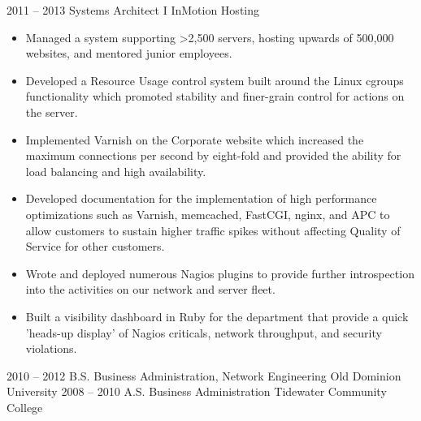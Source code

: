 \documentclass[9pt]{developercv}
\begin{document}
\begin{entrylist}
{\begin{itemize}
		  \end{itemize}
		  }
	\entry
		{2011 -- 2013}
		{Systems Architect I}
		{InMotion Hosting}
		{
		  \begin{itemize}
			\item Managed a system supporting >2,500 servers, hosting upwards of 500,000 websites, and mentored junior employees.
			\item Developed a Resource Usage control system built around the Linux cgroups functionality which promoted stability and finer-grain control for actions on the server.
			\item Implemented Varnish on the Corporate website which increased the maximum connections per second by eight-fold and provided the ability for load balancing and high availability.
			\item Developed documentation for the implementation of high performance optimizations such as Varnish, memcached, FastCGI, nginx, and APC to allow customers to sustain higher traffic spikes without affecting Quality of Service for other customers.
			\item Wrote and deployed numerous Nagios plugins to provide further introspection into the activities on our network and server fleet.
			\item Built a visibility dashboard in Ruby for the department that provide a quick ’heads-up display’ of Nagios criticals, network throughput, and security violations.
		  \end{itemize}
		}
\end{entrylist}



\begin{entrylist}
	\entry
		{2010 -- 2012}
		{B.S. Business Administration, Network Engineering}
		{Old Dominion University}
		{}
	\entry
		{2008 -- 2010}
		{A.S. Business Administration}
		{Tidewater Community College}
		{}
\end{entrylist}

\end{document}
